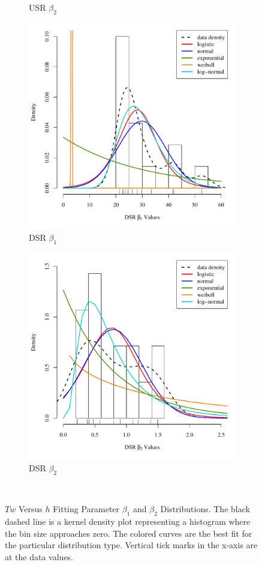 \begin{figure}[htbp]
\begin{subfigure}{0.5\textwidth}
	\caption{USR $\beta_2$}
\end{subfigure}
\begin{subfigure}{0.5\textwidth}
	\centering
	\includegraphics[width=0.9\linewidth]{"Figures/Results_DSR/Stochastic/DSR B1 Dist"}
	\caption{DSR $\beta_1$}
\end{subfigure}%
\begin{subfigure}{0.5\textwidth}
	\centering
	\includegraphics[width=0.9\linewidth]{"Figures/Results_DSR/Stochastic/DSR B2 Dist"}
	\caption{DSR $\beta_2$}
\end{subfigure}\\
\caption[$Tw$ Versus $h$ Fitting Parameter $\beta_1$ and $\beta_2$ Distributions.]{$Tw$ Versus $h$ Fitting Parameter $\beta_1$ and $\beta_2$ Distributions.  The black dashed line is a kernel density plot representing a histogram where the bin size approaches zero.  The colored curves are the best fit for the particular distribution type.  Vertical tick marks in the x-axis are at the data values.}
\label{fig:B1B2}
\end{figure}

